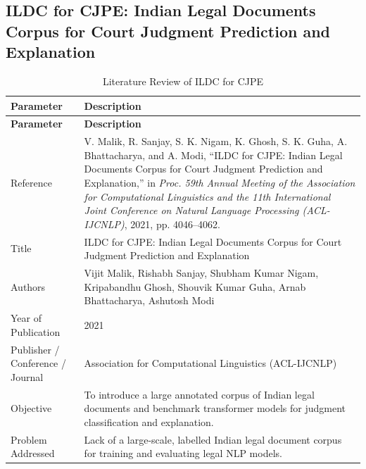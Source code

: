 \subsection{ILDC for CJPE: Indian Legal Documents Corpus for Court Judgment Prediction and Explanation}

\def\PaperTitle{ILDC for CJPE}
\def\PaperLabel{tab:paper3}

\renewcommand{\arraystretch}{1.4}

\begin{longtable}{|p{5cm}|p{10cm}|}
\caption{Literature Review of ILDC for CJPE}
\label{tab:paper3}\\

\hline
\textbf{Parameter} & \textbf{Description} \\
\hline
\endfirsthead

\hline
\textbf{Parameter} & \textbf{Description} \\
\hline
\endhead

Reference &
V. Malik, R. Sanjay, S. K. Nigam, K. Ghosh, S. K. Guha, A. Bhattacharya, and A. Modi, ``ILDC for CJPE: Indian Legal Documents Corpus for Court Judgment Prediction and Explanation,'' in \textit{Proc. 59th Annual Meeting of the Association for Computational Linguistics and the 11th International Joint Conference on Natural Language Processing (ACL-IJCNLP)}, 2021, pp. 4046--4062.
\\ \hline

Title &
ILDC for CJPE: Indian Legal Documents Corpus for Court Judgment Prediction and Explanation
\\ \hline

Authors &
Vijit Malik, Rishabh Sanjay, Shubham Kumar Nigam, Kripabandhu Ghosh, Shouvik Kumar Guha, Arnab Bhattacharya, Ashutosh Modi
\\ \hline

Year of Publication &
2021
\\ \hline

Publisher / Conference / Journal &
Association for Computational Linguistics (ACL-IJCNLP)
\\ \hline

Objective &
To introduce a large annotated corpus of Indian legal documents and benchmark transformer models for judgment classification and explanation.
\\ \hline

Problem Addressed &
Lack of a large-scale, labelled Indian legal document corpus for training and evaluating legal NLP models.
\\ \hline


\end{longtable}
